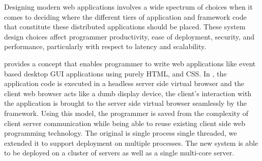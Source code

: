 \documentclass[12pt]{report}
\begin{document}
Designing modern web applications involves a wide spectrum of
choices when it comes to deciding where the different tiers of
application and framework code that constitute these distributed
applications should be placed.  These system design choices affect 
programmer productivity, ease of deployment, security, and performance, 
particularly with respect to latency and scalability.

\cb provides a concept that enables programmer to 
write web applications like event based desktop GUI applications
using purely HTML, \js and CSS.
In \cb, the application code is executed in a headless server side
virtual browser and the client web browser acts like a dumb display
device, 
the client's interaction with the application is brought to the
server side virtual browser seamlessly by the framework. 
Using this model, the programmer is saved from the complexity of
client server communication while being able to
reuse existing client side web programming technology.
The original \cb is single process single threaded,
we extended it to support deployment on multiple processes.
The new system is able to be deployed on a cluster of servers
as well as a single multi-core server.

\vfill


\pagebreak



\tableofcontents
\pagebreak

\listoffigures
\pagebreak

\listoftables
\pagebreak

\pagestyle{myheadings}












%


\end{document}
